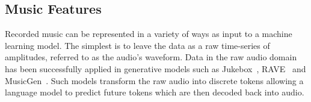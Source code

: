 




\subsection{Music Features}\label{sec:background-features}

Recorded music can be represented in a variety of ways as input to a machine learning model. The simplest is to leave the data as a raw time-series of amplitudes, referred to as the audio's waveform. Data in the raw audio domain has been successfully applied in generative models such as Jukebox~\citep{Jukebox}, RAVE~\citep{RAVE} and MusicGen~\citep{MusicGen}. Such models transform the raw audio into discrete tokens allowing a language model to predict future tokens which are then decoded back into audio.

